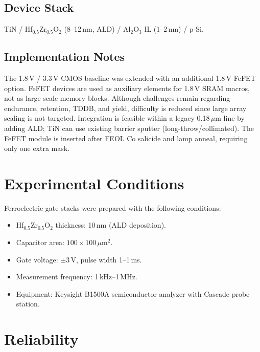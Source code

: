 \documentclass[journal]{IEEEtran}
\begin{document}
\subsection*{Device Stack}
TiN / Hf$_{0.5}$Zr$_{0.5}$O$_2$ (8--12\,nm, ALD) / Al$_2$O$_3$ IL (1--2\,nm) / p-Si.

\subsection*{Implementation Notes}
The 1.8\,V / 3.3\,V CMOS baseline was extended with an additional 1.8\,V FeFET option. FeFET devices are used as auxiliary elements for 1.8\,V SRAM macros, not as large-scale memory blocks. Although challenges remain regarding endurance, retention, TDDB, and yield, difficulty is reduced since large array scaling is not targeted. Integration is feasible within a legacy 0.18\,$\mu$m line by adding ALD; TiN can use existing barrier sputter (long-throw/collimated). The FeFET module is inserted after FEOL Co salicide and lamp anneal, requiring only one extra mask.

\section{Experimental Conditions}
Ferroelectric gate stacks were prepared with the following conditions:
\begin{itemize}
  \item Hf$_{0.5}$Zr$_{0.5}$O$_2$ thickness: 10\,nm (ALD deposition).
  \item Capacitor area: $100 \times 100\,\mu\mathrm{m}^2$.
  \item Gate voltage: $\pm 3$\,V, pulse width 1--1\,ms.
  \item Measurement frequency: 1\,kHz--1\,MHz.
  \item Equipment: Keysight B1500A semiconductor analyzer with Cascade probe station.
\end{itemize}

\section{Reliability}
\end{document}
